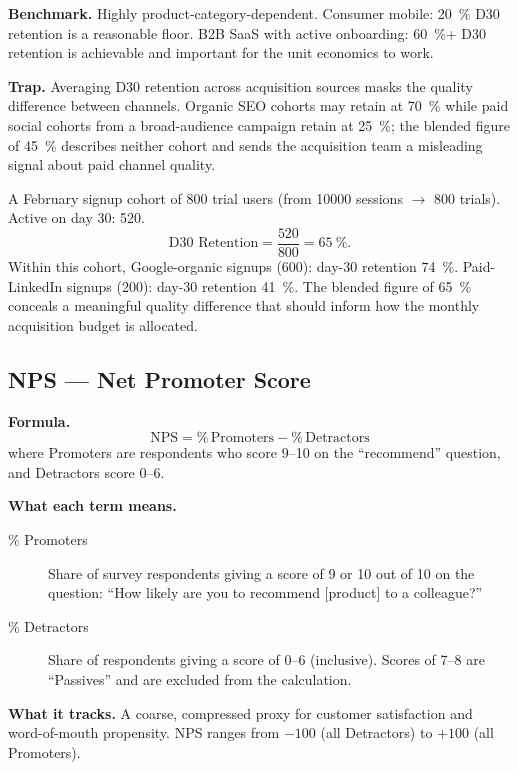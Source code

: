 \textbf{Benchmark.} Highly product-category-dependent. Consumer mobile: \qty{20}{\percent}
D30 retention is a reasonable floor. B2B SaaS with active onboarding: \qty{60}{\percent}+
D30 retention is achievable and important for the unit economics to work.

\textbf{Trap.} Averaging D30 retention across acquisition sources masks the quality
difference between channels. Organic SEO cohorts may retain at \qty{70}{\percent} while
paid social cohorts from a broad-audience campaign retain at \qty{25}{\percent}; the blended
figure of \qty{45}{\percent} describes neither cohort and sends the acquisition team a
misleading signal about paid channel quality.

\begin{example}
A February signup cohort of \num{800} trial users (from \num{10000} sessions $\to$
\num{800} trials). Active on day 30: \num{520}.
\[
  \text{D30 Retention} = \frac{520}{800} = \qty{65}{\percent}.
\]
Within this cohort, Google-organic signups (600): day-30 retention \qty{74}{\percent}.
Paid-LinkedIn signups (200): day-30 retention \qty{41}{\percent}. The blended figure of
\qty{65}{\percent} conceals a meaningful quality difference that should inform how the
 monthly acquisition budget is allocated.
\end{example}


\subsection{NPS --- Net Promoter Score}

\textbf{Formula.}
\[
  \mathrm{NPS} = \%\,\text{Promoters} - \%\,\text{Detractors}
\]
where Promoters are respondents who score 9--10 on the ``recommend'' question, and Detractors
score 0--6.

\textbf{What each term means.}
\begin{description}
  \item[\% Promoters] Share of survey respondents giving a score of 9 or 10 out of 10 on
    the question: ``How likely are you to recommend [product] to a colleague?''
  \item[\% Detractors] Share of respondents giving a score of 0--6 (inclusive). Scores of
    7--8 are ``Passives'' and are excluded from the calculation.
\end{description}

\textbf{What it tracks.} A coarse, compressed proxy for customer satisfaction and word-of-mouth
propensity. NPS ranges from $-100$ (all Detractors) to $+100$ (all Promoters).

